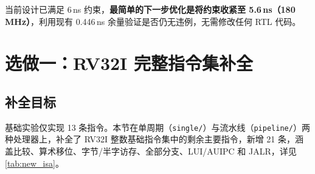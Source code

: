 \documentclass[12pt,hyperref,a4paper,UTF8]{ctexart}
\begin{document}
当前设计已满足 6\,ns 约束，\textbf{最简单的下一步优化是将约束收紧至 5.6\,ns（180\,MHz）}，利用现有 0.446\,ns 余量验证是否仍无违例，无需修改任何 RTL 代码。

\section{选做一：RV32I 完整指令集补全}

\subsection{补全目标}

基础实验仅实现 13 条指令。本节在单周期（\texttt{single/}）与流水线（\texttt{pipeline/}）两种处理器上，补全了 RV32I 整数基础指令集中的剩余主要指令，新增 21 条，涵盖比较、算术移位、字节/半字访存、全部分支、LUI/AUIPC 和 JALR，详见\autoref{tab:new_isa}。
\end{document}
